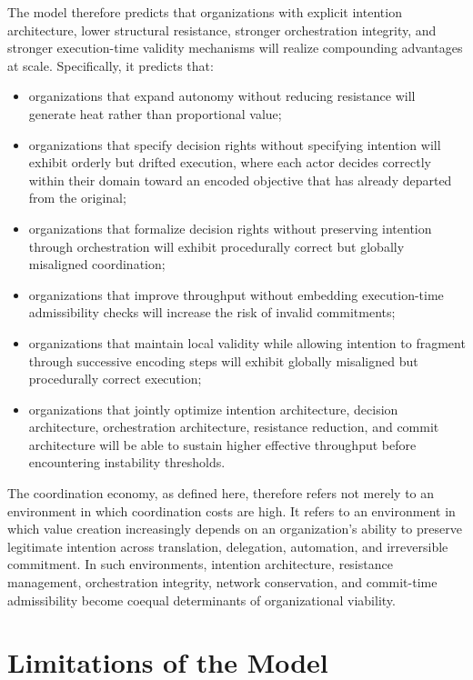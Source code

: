 \documentclass[12pt]{article}
\begin{document}
The model therefore predicts that organizations with explicit intention
architecture, lower structural resistance, stronger orchestration integrity,
and stronger execution-time validity mechanisms will realize compounding
advantages at scale. Specifically, it predicts that:

\begin{itemize}
  \item organizations that expand autonomy without reducing resistance will
    generate heat rather than proportional value;
  \item organizations that specify decision rights without specifying
    intention will exhibit orderly but drifted execution, where each actor
    decides correctly within their domain toward an encoded objective that
    has already departed from the original;
  \item organizations that formalize decision rights without preserving
    intention through orchestration will exhibit procedurally correct but
    globally misaligned coordination;
  \item organizations that improve throughput without embedding
    execution-time admissibility checks will increase the risk of invalid
    commitments;
  \item organizations that maintain local validity while allowing intention
    to fragment through successive encoding steps will exhibit globally
    misaligned but procedurally correct execution;
  \item organizations that jointly optimize intention architecture, decision
    architecture, orchestration architecture, resistance reduction, and
    commit architecture will be able to sustain higher effective throughput
    before encountering instability thresholds.
\end{itemize}

The coordination economy, as defined here, therefore refers not merely to an
environment in which coordination costs are high. It refers to an environment
in which value creation increasingly depends on an organization's ability to
preserve legitimate intention across translation, delegation, automation, and
irreversible commitment. In such environments, intention architecture,
resistance management, orchestration integrity, network conservation, and
commit-time admissibility become coequal determinants of organizational
viability.


\section{Limitations of the Model}
\label{sec:limitations}
\end{document}
